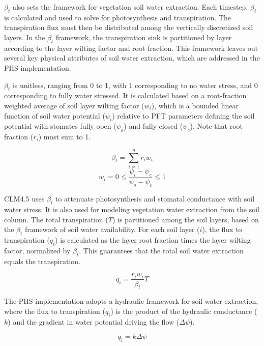 \documentclass[draft,linenumbers]{agujournal}
\begin{document}
    $\beta_t$ also sets the framework for vegetation soil water extraction. 
    Each timestep, $\beta_t$ is calculated and used to solve for photosynthesis and transpiration.
    The transpiration flux must then be distributed among the vertically discretized soil layers.
    In the $\beta_t$ framework, the transpiration sink is partitioned by layer according to the layer wilting factor and root fraction.
    This framework leaves out several key physical attributes of soil water extraction, which are addressed in the PHS implementation.
    
    $\beta_t$ is unitless, ranging from 0 to 1, with 1 corresponding to no water stress, and 0 corresponding to fully water stressed. 
    It is calculated based on a root-fraction weighted average of soil layer wilting factor ($w_i$), which is a bounded linear 
    function of soil water potential ($\psi_i$) relative to PFT parameters defining the soil potential with stomates fully open ($
    \psi_{o}$) and fully closed ($\psi_{c}$). Note that root fraction ($r_i$) must sum to 1.
    
    \begin{linenomath*}
    \begin{equation} \beta_t = \sum_{i=1}^{n}{r_iw_i}
    \label{bt:1}
    \end{equation}
    \begin{equation} 
    \label{bt:2}
    w_i=0 \leq \dfrac{\psi_i-\psi_{c}}{\psi_{o}-\psi_{c}} \leq 1
    \end{equation}
    \end{linenomath*}
    
    CLM4.5 uses $\beta_t$ to attenuate photosynthesis and stomatal conductance with soil water stress. It is also used for 
    modeling vegetation water extraction from the soil column. The total transpiration ($T$) is partitioned among the soil layers, 
    based on the $\beta_t$ framework of soil water availability. For each soil layer ($i$), the flux to transpiration ($q_i$) is 
    calculated as the layer root fraction times the layer wilting factor, normalized by $\beta_t$. This guarantees that the total 
    soil water extraction equals the transpiration.
    \begin{linenomath*}
    \begin{equation}
    \label{bt:4}
    q_i = \dfrac{r_i w_i}{\beta_t}T
    \end{equation}
    \end{linenomath*}
    
    The PHS implementation adopts a hydraulic framework for soil water extraction, where the flux to transpiration ($q_i$) is 
    the product of the hydraulic conductance ($k$) and the gradient in water potential driving the flow ($\Delta\psi$).
    \begin{linenomath*}
    \begin{equation}
    q_i = k\Delta\psi
    \label{phs:sink}
    \end{equation}
    \end{linenomath*}
    
\end{document}
